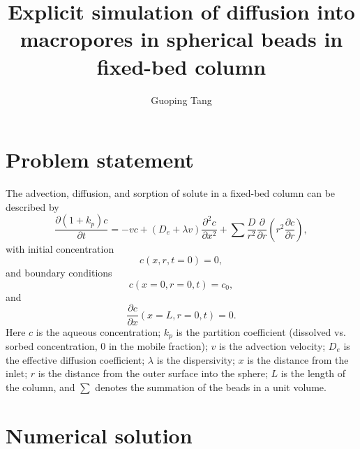 \documentclass{article}
\title{Explicit simulation of diffusion into macropores in spherical beads in fixed-bed column}
\author{Guoping Tang}
\begin{document}
   \maketitle

\section{Problem statement}
The advection, diffusion, and sorption of solute in a fixed-bed column can be described by 
\begin{equation}
\frac{\partial (1 + k_p) c}{\partial t} = - vc + (D_e + \lambda v) \frac{\partial^2 c}{\partial x^2} + \sum \frac{D}{r^2}\frac{\partial }{\partial
r}\left(r^2\frac{\partial c}{\partial r}\right), 
\label{eq:ade}
\end{equation}
with initial concentration 
\begin{equation}
c(x, r, t=0) = 0,
\end{equation}
and boundary conditions
\begin{equation}
c(x=0, r = 0,t) = c_0,
\end{equation}
and
\begin{equation}
\frac{\partial c}{\partial x} (x=L, r=0,t) = 0.
\end{equation}
Here $c$ is the aqueous concentration; $k_p$ is the partition coefficient (dissolved vs. sorbed concentration, 0 in the mobile fraction); $v$ is the advection velocity; $D_e$ is the effective diffusion coefficient; $\lambda$ is the dispersivity; $x$ is the distance from the inlet; $r$ is the distance from the outer surface into the sphere; $L$ is the length of the column, and $\sum$ denotes the summation of the beads in a unit volume. 

\section{Numerical solution}
\end{document}
